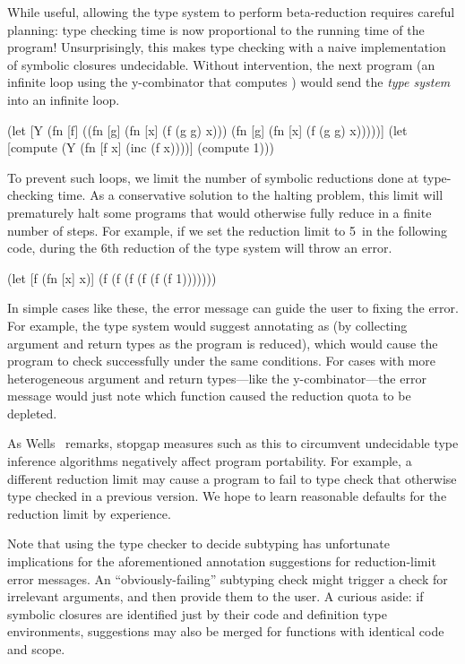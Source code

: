 While useful, allowing the type system to perform beta-reduction
requires careful planning: type checking time is now proportional 
to the running time of the program!
Unsurprisingly, this makes type checking with a naive implementation of symbolic
closures undecidable.
Without intervention,
the next program (an infinite loop using the y-combinator that computes )
would send the \emph{type system} into an infinite loop.

\begin{cljlisting}
(let [Y (fn [f]
          ((fn [g] (fn [x] (f (g g) x)))
           (fn [g] (fn [x] (f (g g) x)))))]
  (let [compute (Y (fn [f x] (inc (f x))))]
    (compute 1)))
\end{cljlisting}

To prevent such loops, we limit the number of symbolic reductions
done at type-checking time.
As a conservative solution to the halting
problem, this limit will prematurely halt some programs that would
otherwise fully reduce in a finite number of steps.
For example, if we set the reduction limit to 5\ in
the following code,
during the 6th reduction of  the type system will
throw an error.

\begin{cljlisting}
(let [f (fn [x] x)]
  (f (f (f (f (f (f 1)))))))
\end{cljlisting}

In simple cases like these, the error message 
can guide the user to fixing the error.
For example, the type system would suggest 
annotating  as  (by collecting
argument and return types as the program is reduced),
which would cause the program to check successfully
under the same conditions.
For cases with more heterogeneous argument and return types---like the y-combinator---the 
error message would just note which function caused
the reduction quota to be depleted.

As Wells~\cite{wells1994typability} remarks,
stopgap measures such as this to circumvent undecidable
type inference algorithms negatively affect
program portability.
For example, a different reduction limit may cause
a program to fail to type check that otherwise type checked
in a previous version.
We hope to learn reasonable defaults for the reduction limit
by experience.

Note that using the type checker to decide subtyping
has unfortunate implications for 
the aforementioned annotation suggestions
for reduction-limit error messages.
An ``obviously-failing'' subtyping check might trigger a
check for irrelevant arguments, and then provide them to the user.
A curious aside: if symbolic closures are identified just by their code and definition
type environments, suggestions may also be merged for functions with
identical code and scope.

